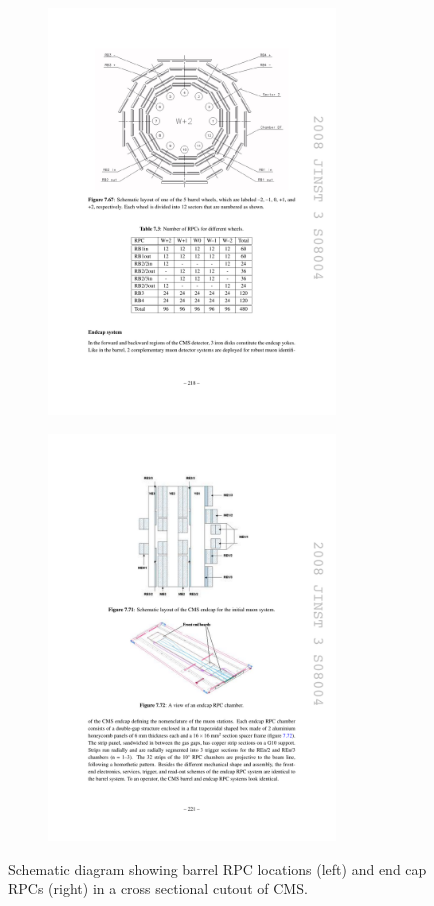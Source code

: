 \begin{figure}[tbh]
\centering
\begin{subfigure}{0.45\textwidth}
\centering
\includegraphics[width=3in]{figures/rpcbarrel.pdf}
\caption{}
\end{subfigure}
\begin{subfigure}{0.45\textwidth}
\centering
\includegraphics[width=3in]{figures/rpcendcap.pdf}
\caption{}
\end{subfigure}
\caption{Schematic diagram showing barrel RPC locations (left) and end cap RPCs (right) in a cross sectional cutout of CMS.}
\label{fig:rpcs}
\end{figure}

